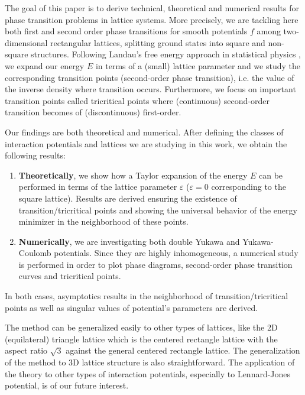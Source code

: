 \documentclass[12pt]{interact}
\theoremstyle{definition}
\begin{document}
\medskip

The goal of this paper is to derive technical, theoretical and numerical
results for phase transition problems in lattice systems. More precisely, we
are tackling here both first and second order phase transitions for smooth
potentials $f$ among two-dimensional rectangular lattices, splitting ground
states into square and non-square structures. Following Landau's free energy
approach in statistical physics \cite{Bausch72,Landau37,Landau13,Toledano87},
we expand our energy $E$ in terms of a (small) lattice parameter and
we study the corresponding transition points (second-order phase transition),
i.e. the value of the inverse density where transition occurs.
Furthermore, we focus on important transition points called tricritical points
where (continuous) second-order transition becomes of (discontinuous)
first-order.

\medskip

Our findings are both theoretical and numerical. After defining the classes of interaction potentials and lattices we are studying in this work, we obtain the following results:
\begin{enumerate}
\item \textbf{Theoretically}, we show how a Taylor expansion of the energy $E$ can be performed in terms of the lattice parameter $\varepsilon$ ($\varepsilon=0$ corresponding to the square lattice). Results are derived ensuring the existence of transition/tricritical points and showing the universal behavior of the energy minimizer in the neighborhood of these points.\\
\item \textbf{Numerically}, we are investigating both double Yukawa and Yukawa-Coulomb potentials. Since they are highly inhomogeneous, a numerical study is performed in order to plot phase diagrams, second-order phase transition curves and tricritical points. 
\end{enumerate}
In both cases, asymptotics results in the neighborhood of
transition/tricritical points as well as singular values of
potential's parameters are derived.

\medskip

The method can be generalized easily to other types of lattices,
like the 2D (equilateral) triangle lattice which is the centered rectangle
lattice with the aspect ratio $\sqrt{3}$ against the general centered
rectangle lattice.
The generalization of the method to 3D lattice structure is also
straightforward.
The application of the theory to other types of interaction potentials,
especially to Lennard-Jones potential, is of our future interest.
\end{document}
